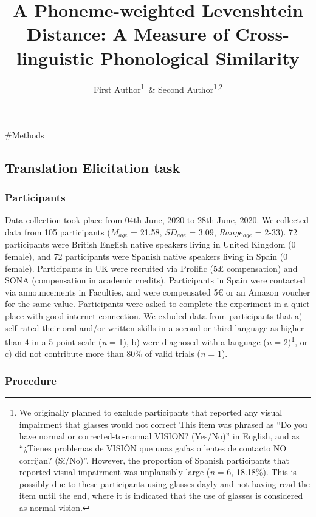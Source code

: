 \documentclass[english,man]{apa6}
\author{First Author\textsuperscript{1}\ \& Second Author\textsuperscript{1,2}}
\affiliation{\phantom{a}}
\title{A Phoneme-weighted Levenshtein Distance: A Measure of Cross-linguistic Phonological Similarity}
\date{}
\begin{document}
\maketitle

\#Methods

\hypertarget{translation-elicitation-task}{%
\subsection{Translation Elicitation task}\label{translation-elicitation-task}}

\hypertarget{participants}{%
\subsubsection{Participants}\label{participants}}

Data collection took place from 04th June, 2020 to 28th June, 2020. We collected data from 105 participants (\(M_{age}\) = 21.58, \(SD_{age}\) = 3.09, \(Range_{age}\) = 2-33). 72 participants were British English native speakers living in United Kingdom (0 female), and 72 participants were Spanish native speakers living in Spain (0 female). Participants in UK were recruited via Prolific (5£ compensation) and SONA (compensation in academic credits). Participants in Spain were contacted via announcements in Faculties, and were compensated 5€ or an Amazon voucher for the same value. Participants were asked to complete the experiment in a quiet place with good internet connection. We exluded data from participants that a) self-rated their oral and/or written skills in a second or third language as higher than 4 in a 5-point scale (\emph{n} = 1), b) were diagnosed with a language (\emph{n} = 2)\footnote{We originally planned to exclude participants that reported any visual impairment that glasses would not correct This item was phrased as \enquote{Do you have normal or corrected-to-normal VISION? (Yes/No)} in English, and as \enquote{¿Tienes problemas de VISIÓN que unas gafas o lentes de contacto NO corrijan? (Sí/No)}. However, the proportion of Spanish participants that reported visual impairment was unplausibly large (\emph{n} = 6, 18.18\%). This is possibly due to these participants using glasses dayly and not having read the item until the end, where it is indicated that the use of glasses is considered as normal vision.}, or c) did not contribute more than 80\% of valid trials (\emph{n} = 1).

\hypertarget{procedure}{%
\subsubsection{Procedure}\label{procedure}}
\end{document}
